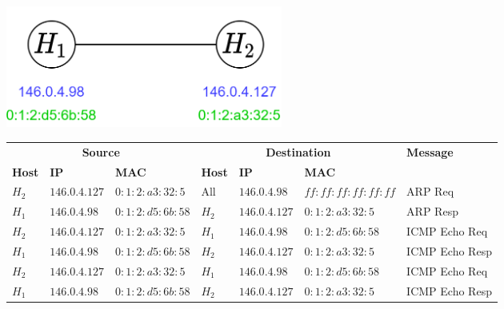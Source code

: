 \begin{center}\includegraphics[width=0.4\textwidth]{data_link_layer/images/arp example}\end{center}
\begin{center}
    \begin{tabular}{l l l | l l l | l }
        \multicolumn{3}{c}{\textbf{Source}} & \multicolumn{3}{c}{\textbf{Destination}} & \multirow{2}{*}{\textbf{Message}}                                                                        \\
        \textbf{Host}                       & \textbf{IP}                              & \textbf{MAC}                      & \textbf{Host} & \textbf{IP}   & \textbf{MAC}        &                \\
        $H_2$                               & $146.0.4.127$                            & $0:1:2:a3:32:5$                   & All           & $146.0.4.98$  & $ff:ff:ff:ff:ff:ff$ & ARP Req        \\
        $H_1$                               & $146.0.4.98$                             & $0:1:2:d5:6b:58$                  & $H_2$         & $146.0.4.127$ & $0:1:2:a3:32:5$     & ARP Resp       \\
        $H_2$                               & $146.0.4.127$                            & $0:1:2:a3:32:5$                   & $H_1$         & $146.0.4.98$  & $0:1:2:d5:6b:58$    & ICMP Echo Req  \\
        $H_1$                               & $146.0.4.98$                             & $0:1:2:d5:6b:58$                  & $H_2$         & $146.0.4.127$ & $0:1:2:a3:32:5$     & ICMP Echo Resp \\
        $H_2$                               & $146.0.4.127$                            & $0:1:2:a3:32:5$                   & $H_1$         & $146.0.4.98$  & $0:1:2:d5:6b:58$    & ICMP Echo Req  \\
        $H_1$                               & $146.0.4.98$                             & $0:1:2:d5:6b:58$                  & $H_2$         & $146.0.4.127$ & $0:1:2:a3:32:5$     & ICMP Echo Resp \\
    \end{tabular}
\end{center}

